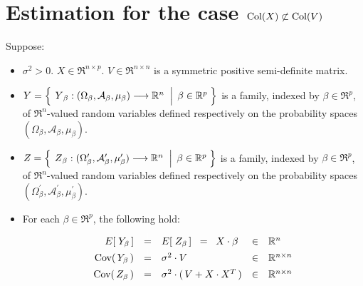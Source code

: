 

\section{Estimation for the case $\textnormal{Col}(X) \not\subset \textnormal{Col}(V)$}
\setcounter{theorem}{0}
\setcounter{equation}{0}

\renewcommand{\theenumi}{\roman{enumi}}
\renewcommand{\labelenumi}{\textnormal{(\theenumi)}$\;\;$}


\begin{theorem}
\mbox{}
\vskip 0.1cm
\noindent
Suppose:
\begin{itemize}
\item
	$\sigma^{2} > 0$.
	\;
	$X \in \Re^{n \times p}$.
	\;
	$V \in \Re^{n \times n}$ is a symmetric positive semi-definite matrix.
\item
	$Y = \left\{\;
		\left.
		\overset{{\color{white}.}}{Y}_{\beta} : (\Omega_{\beta},\mathcal{A}_{\beta},\mu_{\beta}) \longrightarrow \Re^{n}
		\;\;\right\vert\;
		\beta \in \Re^{p}
		\;\right\}$
	is a family, indexed by $\beta \in \Re^{p}$,
	of $\Re^{n}$-valued random variables defined respectively on the
	probability spaces $(\Omega_{\beta},\mathcal{A}_{\beta},\mu_{\beta})$.
\item
	$Z = \left\{\;
		\left.
		\overset{{\color{white}.}}{Z}_{\beta}
		: (\Omega^{\prime}_{\beta},\mathcal{A}^{\prime}_{\beta},\mu^{\prime}_{\beta}) \longrightarrow \Re^{n}
		\;\;\right\vert\;
		\beta \in \Re^{p}
		\;\right\}$
	is a family, indexed by $\beta \in \Re^{p}$,
	of $\Re^{n}$-valued random variables defined respectively on the
	probability spaces $(\Omega^{\prime}_{\beta},\mathcal{A}^{\prime}_{\beta},\mu^{\prime}_{\beta})$.
\item
	For each $\beta \in \Re^{p}$, the following hold:
	\begin{equation*}
	\begin{array}{rclcl}
	E\!\left[\;Y_{\beta}\,\right]
		& \overset{{\color{white}\vert}}{=} &
		E\!\left[\;Z_{\beta}\,\right] \;\; = \;\; X \cdot \beta & \in & \Re^{n}
	\\
	\Cov\!\left(\,Y_{\beta}\,\right)
		& \overset{{\color{white}\vert}}{=} &
		\sigma^{2} \cdot V & \in & \Re^{n \times n}
	\\
	\Cov\!\left(\,Z_{\beta}\,\right)
		& \overset{{\color{white}\vert}}{=} &
		\sigma^{2} \cdot (\,V+X\cdot X^{T}\,) & \in & \Re^{n \times n}
	\end{array}

\end{equation*}
\end{itemize}
\end{theorem}
